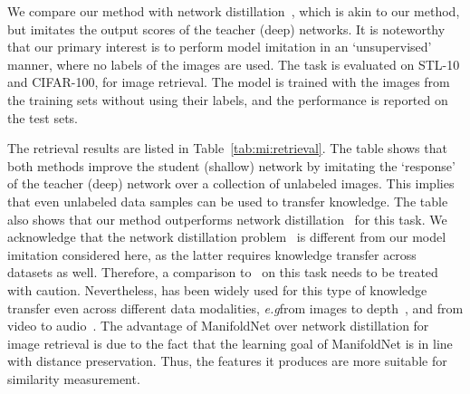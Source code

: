 \documentclass{bmvc2k}
\def\eg{\emph{e.g}\bmvaOneDot}
\begin{document}
We compare our method with network
distillation~\cite{hinton2015distilling}, which is akin to
our method, but imitates the output scores of the teacher (deep)
networks. It is noteworthy that our primary interest is to perform
model imitation in an `unsupervised' manner, where no labels of the
images are used.
The task is evaluated on STL-10 and CIFAR-100, for image
retrieval. The model is trained with the images from the training sets
without using their labels, and the performance is reported on the test sets. 


The retrieval results are listed in Table~\ref{tab:mi:retrieval}.
The table shows that both methods improve the student (shallow)
network by imitating the `response' of the teacher (deep) network over
a collection of unlabeled images. This implies that even
unlabeled data samples can be used to transfer knowledge. 
The table also shows that
our method outperforms network
distillation~\cite{hinton2015distilling} for this task. 
We acknowledge that the network distillation problem~\cite{hinton2015distilling} is different from our model imitation considered here, as the latter requires knowledge transfer across datasets as well. Therefore, a comparison to~\cite{hinton2015distilling} on this task needs to be treated with caution. Nevertheless, \cite{hinton2015distilling} has been widely used for this type of knowledge transfer  even across different data modalities, \eg from images to depth~\cite{supervision:transfer}, and from video
to audio~\cite{video2sound}.  
The advantage of ManifoldNet over network distillation for image retrieval is due to the fact that the learning goal of ManifoldNet is in line with distance preservation. Thus, the features it produces are more suitable for similarity measurement. 


  
\end{document}
